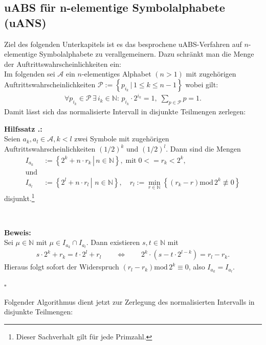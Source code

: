\documentclass[a4paper,12pt]{article}
\newcommand{\N}{\mathbb N}
\newcommand{\A}{\mathcal A}
\newcommand{\xP}{\mathcal P}
\newcounter{Hilfssatz}
\newcounter{Algorithmus}
\newenvironment{Hilfssatz}{
\medskip
        
        \setlength{\parindent}{0pt}
        \addtocounter{Hilfssatz}{1}
        \textbf{\textsf{Hilfssatz \thesubsection.\theHilfssatz}:}\\}{
        \nopagebreak
        \vspace{-1.0ex}
        \bigskip\\
        
}
\newenvironment{proof}{
\bigskip
        
        \setlength{\parindent}{0pt}
        \textbf{Beweis:}\\}{
        \nopagebreak
        \vspace{-1.0ex}
        \begin{flushright}
             $\square$
        \end{flushright}
        \bigskip
        
}
\begin{document}
\subsection{uABS für n-elementige Symbolalphabete (uANS)}
Ziel des folgenden Unterkapitels ist es das besprochene uABS-Verfahren auf $n$-elementige Symbolalphabete zu verallgemeinern. Dazu schränkt man die Menge der Auftrittswahrscheinlichkeiten ein: 
\\
Im folgenden sei $\A$ ein $n$-elementiges Alphabet $(n > 1)$ mit zugehörigen Auftrittswahrscheinlichkeiten $\xP:=\left\{p_{i_{k}}\,|\,1\leq k \leq n-1\right\}$ wobei gilt:
\begin{align*}
\forall p_{i_{k}} \in \xP\, \exists\, i_{k}\in\N :\, p_{i_{k}}\cdot 2^{i_{k}} =1,\; \sum_{p\in\xP}p = 1.
\end{align*}
Damit lässt sich das  normalisierte Intervall in disjunkte Teilmengen zerlegen:
\begin{Hilfssatz}

Seien $a_{k}, a_{l}\in \A, k < l$ zwei Symbole mit zugehörigen Auftrittswahrscheinlichkeiten $\left(1 / 2\right)^{k}$ und $\left(1 / 2\right)^{l}$.
Dann sind die Mengen
\begin{align*}
I_{a_k}&:=\left\{2^k + n\cdot r_k \,\left|\right.\, n\in\N\right\},\;\text{mit}\; 0<= r_k <2^k,
\\
\text{und} 
\\
I_{a_l}&:=\left\{2^l +  n\cdot r_l\,\left|\right.\,\,n\in\N \right\},
\quad
r_l:=\min_{r\in\N}
\left\{(r_k-r)\text{mod}\,2^k \not\equiv 0\right\}
\end{align*}
disjunkt.\footnote{\footnotesize{Dieser Sachverhalt gilt für jede Primzahl.}}
\end{Hilfssatz}
\begin{proof}
Sei $\mu\in\N$ mit $\mu\in I_{a_k}\cap I_{a_l}$. Dann existieren $s,t \in\N$ mit
\begin{align*}
 s\cdot 2^k + r_k =t \cdot 2^l +  r_l\qquad \Leftrightarrow\qquad 2^k\cdot \left(s - t\cdot 2^{l-k}\right) = r_l - r_k.
\end{align*}
Hieraus folgt sofort der Widerspruch $(r_l-r_k)\text{mod}\,2^k \equiv 0$, also $I_{a_{k}}= I_{a_{l}}$.
\end{proof}
Folgender Algorithmus dient jetzt zur Zerlegung des normalisierten Intervalls in disjunkte Teilmengen: 
\end{document}

